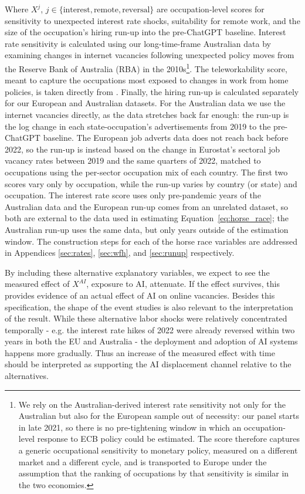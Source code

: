 \documentclass[11pt]{article}
\begin{document}
Where $X^j$, $j \in \{\text{interest},\text{remote},\text{reversal}\}$ are occupation-level scores for sensitivity to unexpected interest rate shocks, suitability for remote work, and the size of the occupation's hiring run-up into the pre-ChatGPT baseline. Interest rate sensitivity is calculated using our long-time-frame Australian data by examining changes in internet vacancies following unexpected policy moves from the Reserve Bank of Australia (RBA) in the 2010s\footnote{We rely on the Australian-derived interest rate sensitivity not only for the Australian but also for the European sample out of necessity: our panel starts in late 2021, so there is no pre-tightening window in which an occupation-level response to ECB policy could be estimated. The score therefore captures a generic occupational sensitivity to monetary policy, measured on a different market and a different cycle, and is transported to Europe under the assumption that the ranking of occupations by that sensitivity is similar in the two economies.}. The teleworkability score, meant to capture the occupations most exposed to changes in work from home policies, is taken directly from \citet{dingel2020teleworkable}. Finally, the hiring run-up is calculated separately for our European and Australian datasets. For the Australian data we use the internet vacancies directly, as the data stretches back far enough: the run-up is the log change in each state-occupation's advertisements from 2019 to the pre-ChatGPT baseline. The European job adverts data does not reach back before 2022, so the run-up is instead based on the change in Eurostat's sectoral job vacancy rates between 2019 and the same quarters of 2022, matched to occupations using the per-sector occupation mix of each country. The first two scores vary only by occupation, while the run-up varies by country (or state) and occupation. The interest rate score uses only pre-pandemic years of the Australian data and the European run-up comes from an unrelated dataset, so both are external to the data used in estimating Equation~\ref{eq:horse_race}; the Australian run-up uses the same data, but only years outside of the estimation window. The construction steps for each of the horse race variables are addressed in Appendices \ref{sec:rates}, \ref{sec:wfh}, and \ref{sec:runup} respectively.

By including these alternative explanatory variables, we expect to see the measured effect of $X^{AI}$, exposure to AI, attenuate. If the effect survives, this provides evidence of an actual effect of AI on online vacancies. Besides this specification, the shape of the event studies is also relevant to the interpretation of the result. While these alternative labor shocks were relatively concentrated temporally - e.g. the interest rate hikes of 2022 were already reversed within two years in both the EU and Australia - the deployment and adoption of AI systems happens more gradually. Thus an increase of the measured effect with time should be interpreted as supporting the AI displacement channel relative to the alternatives.
\end{document}
